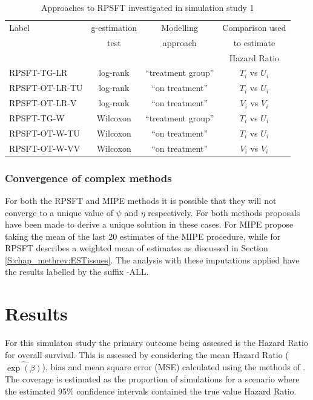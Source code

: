 \begin{table}[ht] 
\caption{Approaches to RPSFT investigated in simulation study 1}
\centering 

\begin{tabular}{ l c c c}
\hline
\hline
Label  & g-estimation     & Modelling  & Comparison used            \\
       & test             & approach   & to estimate                \\
       &                  &            & Hazard Ratio               \\ 
\hline 
RPSFT-TG-LR    & log-rank & ``treatment group'' & $T_i$ vs $U_i$ \\
RPSFT-OT-LR-TU & log-rank & ``on treatment''    & $T_i$ vs $U_i$ \\
RPSFT-OT-LR-V  & log-rank & ``on treatment''    & $V_i$ vs $V_i$ \\
\hline
RPSFT-TG-W     & Wilcoxon & ``treatment group'' & $T_i$ vs $U_i$ \\
RPSFT-OT-W-TU  & Wilcoxon & ``on treatment''    & $T_i$ vs $U_i$ \\
RPSFT-OT-W-VV  & Wilcoxon & ``on treatment''    & $V_i$ vs $V_i$ \\
\hline 
\end{tabular} 
\label{T:chap_sim2:Sim1RPSFTlab}
\end{table}


\subsubsection{Convergence of complex methods}

\label{S:chap_sim2:convimp}

For both the RPSFT and MIPE methods it is possible that they will not converge to a unique value of $\psi$ and $\eta$ respectively. For both methods proposals have been made to derive a unique solution in  these cases. For MIPE \cite{Zhang2016} propose taking the mean of the last 20 estimates of the MIPE procedure, while for RPSFT \cite{White1999} describes a weighted mean of estimates as discussed in Section \ref{S:chap_methrev:ESTissues}. The analysis with these imputations applied have the results labelled by the suffix -ALL.

\section{Results}
\label{S:chap_sim2:resmeth}

For this simulaton study the primary outcome being assessed is the Hazard Ratio for overall survival. This is assessed by considering the mean Hazard Ratio ($\hat{\exp(\beta)}$), bias and mean square error (MSE) calculated using the methods of \cite{Burton2006}. The coverage is estimated as the proportion of simulations for a scenario where the estimated 95\% confidence intervals contained the true value Hazard Ratio.

